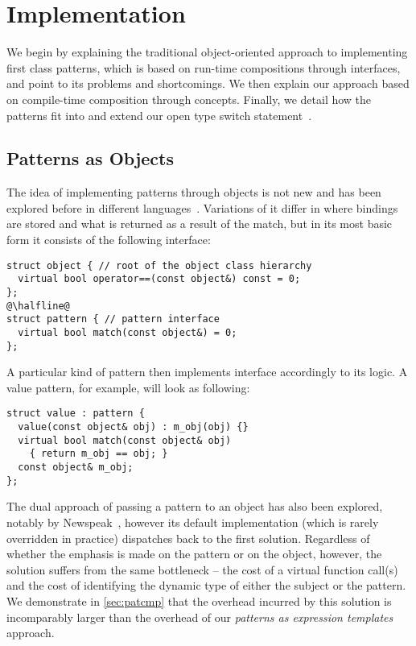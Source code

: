 \section{Implementation} %
\label{sec:impl}

We begin by explaining the traditional object-oriented approach to implementing 
first class patterns, which is based on run-time compositions through 
interfaces, and point to its problems and shortcomings. We then explain our 
approach based on compile-time composition through concepts. Finally, we detail 
how the patterns fit into and extend our open type switch statement~\cite{TS12}. 

\subsection{Patterns as Objects}
\label{sec:pao}

The idea of implementing patterns through objects is not new and has been 
explored before in different languages~\cite{Visser06matchingobjects,geller2010pattern,FuncCSharp,Grace2012}.
Variations of it differ in where bindings are stored and what is returned as a 
result of the match, but in its most basic form it consists of the following 
interface:

\begin{lstlisting}[keepspaces,columns=flexible]
struct object { // root of the object class hierarchy
  virtual bool operator==(const object&) const = 0;
};
@\halfline@
struct pattern { // pattern interface
  virtual bool match(const object&) = 0;
};
\end{lstlisting}

\noindent
A particular kind of pattern then implements  interface 
accordingly to its logic. A value pattern, for example, will look as following:

\begin{lstlisting}[keepspaces,columns=flexible]
struct value : pattern {
  value(const object& obj) : m_obj(obj) {}
  virtual bool match(const object& obj) 
    { return m_obj == obj; }
  const object& m_obj;
};
\end{lstlisting}

\noindent
The dual approach of passing a pattern to an object has also been explored, 
notably by Newspeak~\cite{geller2010pattern}, however its default implementation 
(which is rarely overridden in practice) dispatches back to the first solution. 
Regardless of whether the emphasis is made on the pattern or on the object, however,
the solution suffers from the same bottleneck -- the cost of a virtual function 
call(s) and the cost of identifying the dynamic type of either the subject or 
the pattern. We demonstrate in \textsection\ref{sec:patcmp} that the overhead 
incurred by this solution is incomparably larger than the overhead of our 
\emph{patterns as expression templates} approach.

